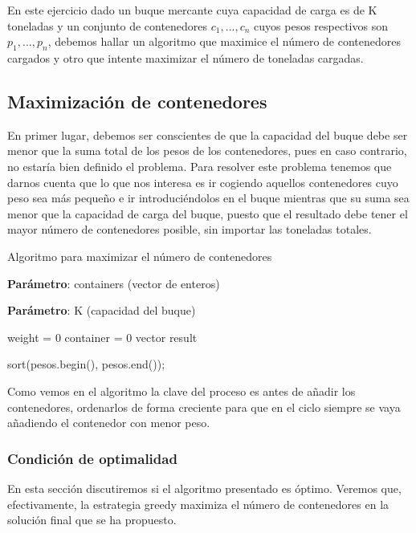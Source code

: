 En este ejercicio dado un buque mercante cuya capacidad de carga es de K toneladas y un conjunto de contenedores $c_1,...,c_n$ cuyos
pesos respectivos son $p_1,...,p_n$, debemos hallar un algoritmo que maximice el número de contenedores cargados y otro que intente 
maximizar el número de toneladas cargadas.

\subsection{Maximización de contenedores}

En primer lugar, debemos ser conscientes de que la capacidad del buque debe ser menor que la suma total de los pesos 
de los contenedores, pues en caso contrario, no estaría bien definido el problema. Para resolver este problema tenemos que darnos cuenta
que lo que nos interesa es ir cogiendo aquellos contenedores cuyo peso sea más pequeño e ir introduciéndolos en el buque mientras que su suma 
sea menor que la capacidad de carga del buque, puesto que el resultado debe tener el mayor número de contenedores posible, sin importar las 
toneladas totales. 

\begin{algorithm}[H]
    \caption{Algoritmo para maximizar el número de contenedores}\label{alg:max_containers}
    \begin{minipage}{0.92\textwidth}
    \textbf{Parámetro}: containers (vector de enteros)

    \textbf{Parámetro}: K (capacidad del buque)

    \end{minipage}

    weight = 0\;
	container = 0\;
    vector result\;
  
    sort(pesos.begin(), pesos.end());

  
    
\end{algorithm}

Como vemos en el algoritmo la clave del proceso es antes de añadir los contenedores, ordenarlos de forma creciente para que 
en el ciclo siempre se vaya añadiendo el contenedor con menor peso.

\subsubsection{Condición de optimalidad}
En esta sección discutiremos si el algoritmo presentado es óptimo. Veremos que,
efectivamente, la estrategia greedy maximiza el número de contenedores 
en la solución final que se ha propuesto. 


